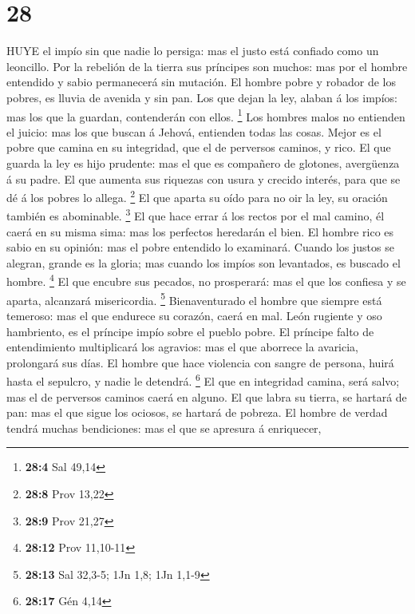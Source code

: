 \hypertarget{section-27}{%
\section{28}\label{section-27}}

 HUYE el impío sin que nadie lo persiga: mas el justo está
confiado como un leoncillo.  Por la rebelión de la tierra
sus príncipes son muchos: mas por el hombre entendido y sabio
permanecerá sin mutación.  El hombre pobre y robador de los
pobres, es lluvia de avenida y sin pan.  Los que dejan la
ley, alaban á los impíos: mas los que la guardan, contenderán con ellos.
\footnote{\textbf{28:4} Sal 49,14}  Los hombres malos no
entienden el juicio: mas los que buscan á Jehová, entienden todas las
cosas.  Mejor es el pobre que camina en su integridad, que
el de perversos caminos, y rico.  El que guarda la ley es
hijo prudente: mas el que es compañero de glotones, avergüenza á su
padre.  El que aumenta sus riquezas con usura y crecido
interés, para que se dé á los pobres lo allega. \footnote{\textbf{28:8}
  Prov 13,22}  El que aparta su oído para no oir la ley, su
oración también es abominable. \footnote{\textbf{28:9} Prov 21,27}
 El que hace errar á los rectos por el mal camino, él caerá
en su misma sima: mas los perfectos heredarán el bien.  El
hombre rico es sabio en su opinión: mas el pobre entendido lo examinará.
 Cuando los justos se alegran, grande es la gloria; mas
cuando los impíos son levantados, es buscado el hombre. \footnote{\textbf{28:12}
  Prov 11,10-11}  El que encubre sus pecados, no
prosperará: mas el que los confiesa y se aparta, alcanzará misericordia.
\footnote{\textbf{28:13} Sal 32,3-5; 1Jn 1,8; 1Jn 1,1-9} 
Bienaventurado el hombre que siempre está temeroso: mas el que endurece
su corazón, caerá en mal.  León rugiente y oso hambriento,
es el príncipe impío sobre el pueblo pobre.  El príncipe
falto de entendimiento multiplicará los agravios: mas el que aborrece la
avaricia, prolongará sus días.  El hombre que hace
violencia con sangre de persona, huirá hasta el sepulcro, y nadie le
detendrá. \footnote{\textbf{28:17} Gén 4,14}  El que en
integridad camina, será salvo; mas el de perversos caminos caerá en
alguno.  El que labra su tierra, se hartará de pan: mas el
que sigue los ociosos, se hartará de pobreza.  El hombre de
verdad tendrá muchas bendiciones: mas el que se apresura á enriquecer,
